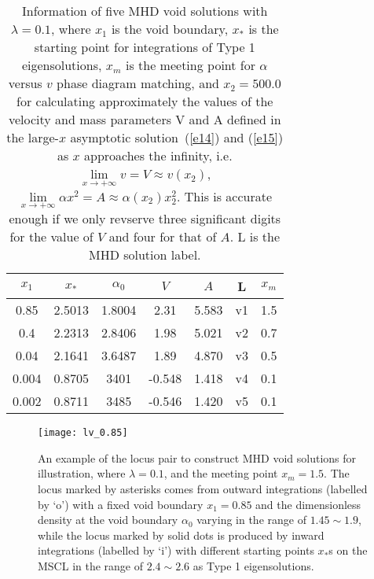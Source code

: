 \documentclass[fleqn,usenatbib]{mnras}
\begin{document}
\begin{table}
  \centering
  \caption{Information of five MHD void solutions with $\lambda=0.1$, where $x_{1}$ is the void boundary, $x_{*}$ is the starting point for integrations of Type 1 eigensolutions, $x_{m}$ is the meeting point for $\alpha$ versus $v$ phase diagram matching, and $x_{2}=500.0$ for calculating approximately the values of the velocity and mass parameters V and A defined in the large-$x$ asymptotic solution~(\ref{e14}) and (\ref{e15}) as $x$ approaches the infinity, i.e. $\lim\limits_{x\rightarrow +\infty} v=V\approx v(x_{2})$, $\lim\limits_{x\rightarrow +\infty}\alpha x^{2}=A\approx \alpha(x_{2})x_{2}^{2}$. This is accurate enough if we only revserve three significant digits for the value of $V$ and four for that of $A$. L is the MHD solution label.}
    \begin{tabular}{ccccccc}
    \hline
    $x_{1}$ & $x_{*}$ & $\alpha_{0}$ & $V$ & $A$ & L & $x_{m}$\\
    \hline
    0.85 & 2.5013 & 1.8004 & 2.31 & 5.583 & v1 & 1.5\\
    0.4 & 2.2313 & 2.8406 & 1.98 & 5.021 & v2 & 0.7\\
    0.04 & 2.1641 & 3.6487 & 1.89 & 4.870 & v3 & 0.5\\
    0.004 & 0.8705 & 3401 & -0.548 & 1.418 & v4 & 0.1\\
    0.002 & 0.8711 & 3485 & -0.546 & 1.420 & v5 & 0.1\\
    \hline
    \end{tabular}
    \label{t1}
\end{table}    

\begin{figure}
\centering
\texttt{[image: lv\_0.85]}
\caption{
An example of the locus pair to construct MHD void solutions for illustration, where $\lambda=0.1$, and the meeting point $x_{m}=1.5$. The locus marked by asterisks comes from outward integrations (labelled by `o') with a fixed void boundary $x_{1}=0.85$ and the dimensionless density at the void boundary $\alpha_{0}$ varying in the range of $1.45\sim 1.9$, while the locus marked by solid dots is produced by inward integrations (labelled by `i') with different starting points $x_{*}$s on the MSCL in the range of $2.4\sim 2.6$ as Type 1 eigensolutions.
 }
\label{1}
\end{figure}
\end{document}
